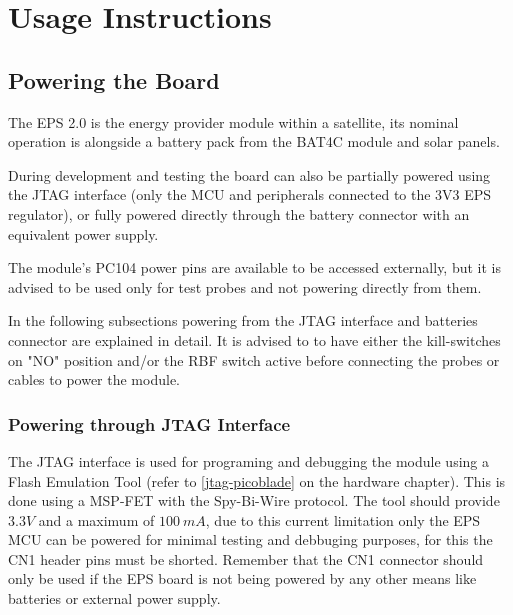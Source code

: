 %
%
%
%
%

%
%
%
%
%
%

\chapter{Usage Instructions} \label{ch:instructions}

\section{Powering the Board}

The EPS 2.0 is the energy provider module within a satellite, its nominal operation is alongside a battery pack from the BAT4C module and solar panels. 

During development and testing the board can also be partially powered using the JTAG interface (only the MCU and peripherals connected to the 3V3 EPS regulator), or fully powered directly through the battery connector with an equivalent power supply.

The module's PC104 power pins are available to be accessed externally, but it is advised to be used only for test probes and not powering directly from them. 

In the following subsections powering from the JTAG interface and batteries connector are explained in detail. 
It is advised to to have either the kill-switches on "NO" position and/or the RBF switch active before connecting the probes or cables to power the module.

 
\subsection{Powering through JTAG Interface}

The JTAG interface is used for programing and debugging the module using a Flash Emulation Tool (refer to \autoref{jtag-picoblade} on the hardware chapter). 
This is done using a MSP-FET with the Spy-Bi-Wire protocol.
The tool should provide $3.3 V$ and a maximum of $100\ mA$, due to this current limitation only the EPS MCU can be powered for minimal testing and debbuging purposes, for this the CN1 header pins must be shorted.
Remember that the CN1 connector should only be used if the EPS board is not being powered by any other means like batteries or external power supply.


